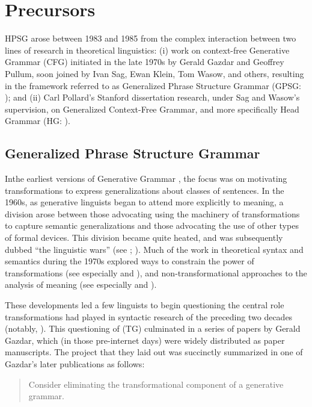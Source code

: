\documentclass[output=paper,biblatex,babelshorthands,newtxmath,draftmode,colorlinks,citecolor=brown]{langscibook}
\begin{document}
\section{Precursors}

HPSG arose between 1983 and 1985 from the complex interaction between two lines of research in
theoretical linguistics: (i) work on context-free Generative Grammar (CFG) initiated in the late
1970s by Gerald Gazdar and Geoffrey Pullum, soon joined by Ivan Sag, Ewan Klein, Tom Wasow, and
others, resulting in the framework referred to as Generalized Phrase Structure Grammar (GPSG:
\citealt*{GKPS85a}); and (ii) Carl Pollard's Stanford dissertation research, under Sag and Wasow's
supervision, on Generalized Context-Free Grammar, and more specifically Head Grammar (HG:
\citealt{Pollard84a-u}).

\subsection{Generalized Phrase Structure Grammar}

In\indexgpsgstart the earliest versions of Generative Grammar \citep{Chomsky57a}, the focus was on motivating
transformations to express generalizations about classes of sentences.  In the 1960s, as generative
linguists began to attend more explicitly to meaning, a division arose between those advocating
using the machinery of transformations to capture semantic generalizations and those advocating the
use of other types of formal devices.  This division became quite heated, and was subsequently
dubbed ``the linguistic wars'' (see \citealt[Chapter 5]{Newmeyer:1980}; \citealt{Harris93a}).  Much
of the work in theoretical syntax and semantics during the 1970s explored ways to constrain the
power of transformations (see especially \citealt{Chomsky73a} and \citealt{ChomLas1977}), and
non-transformational approaches to the analysis of meaning (see especially \citealt{Montague74a-ed}
and \citealt{Dowty79a}).

These developments led a few linguists to begin questioning the central role transformations had
played in syntactic research of the preceding two decades (notably, \citealt{Bresnan78a}).  This
questioning of  (TG) culminated in a series of papers by Gerald Gazdar,
which (in those pre-internet days) were widely distributed as paper manuscripts.  The project that
they laid out was succinctly summarized in one of Gazdar's later publications as follows:

\begin{quote}
Consider eliminating the transformational component of a generative grammar. \citep[]{Gazdar81a}
\end{quote}
\end{document}
